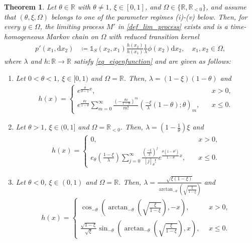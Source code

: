 \documentclass[12pt]{article}
\newcommand{\R}{\mathbb{R}} %
\newcommand{\1}{\mathds{1}}
\renewcommand{\d}{\mathrm{d}}
\theoremstyle{definition}
\theoremstyle{plain}
\newtheorem{Theorem}[definition]{Theorem}
\theoremstyle{remark}
\begin{document}
\begin{Theorem}\label{maintheorem}
    Let $\theta\in\R$ with $\theta\neq1$, $\xi\in[0,1]$, and
$\Omega\in\{\R,\R_{<0}\}$, and assume that
$(\theta,\xi,\Omega)$ belongs to one of the parameter regimes
 (i)-(v) below. Then, for every $y\in\Omega$, the limiting process $M'$ in \eqref{def_lim_process} exists and is a time-homogeneous Markov chain on $\Omega$ with reduced transition kernel 
\begin{align*}
     p'(x_1,\d x_2)&\coloneqq\mathds{1}_S(x_2,x_1)\frac{h(x_2)}{h(x_1)}\frac{1}{\lambda}\phi(x_2)\d x_2,\quad x_1,x_2\in\Omega,
\end{align*}
 where $\lambda$ and $h:\R\to\R$ satisfy \eqref{eq_eigenfunction} and are given as follows:
\begin{enumerate}[label=(\roman*)]
     \item  Let $0<\theta<1$, $\xi\in [0,1)$ and $\Omega=\R$. Then, $\lambda=(1-\xi)(1-\theta)$ and
     \begin{align*}
         h(x)=\begin{cases}
          e^{\frac{\theta}{\theta-1}x},~~~&x>0,
          \\e^{\frac{\theta x}{1-\theta}}\sum_{m=0}^\infty\frac{\left(-\frac{\theta x}{1-\theta}\right)^m}{m!}\left(\frac{-\xi}{\lambda}(1-\theta);\theta\right)_m,~~~~&x\le 0.
      \end{cases}
     \end{align*}
     \item  Let $\theta>1$, $\xi\in(0,1]$ and $\Omega=\R_{<0}$. Then, $\lambda=\left(1-\frac{1}{\theta}\right)\xi$ and
     \begin{align*}
         h(x)= \begin{cases}
          0,~~~&x>0,
          \\{e_\theta\left(\frac{1-\xi}{\lambda}\right)}\sum_{j=0}^\infty \frac{\left(\frac{-\xi}{\lambda}\right)^{j}}{[j]_\theta!}e^{\frac{\theta(1-\theta^j)}{1-\theta}x},\quad &x\le0.\end{cases}
     \end{align*}
 \item Let $\theta <0$, $\xi\in(0,1)$ and $\Omega=\R$. Then, $\lambda= \frac{\sqrt{\xi(1-\xi)}}{\arctan_{-\theta}\left(\sqrt{\frac{\xi}{1-\xi}}\right)}$ and
 \begin{align*}
      h(x)=\begin{cases}
       \cos_{-\theta}\left(\arctan_{-\theta}\left(\sqrt{\frac{\xi}{1-\xi}}\right),-x\right) ,~~&x>0,
        \\\frac{\sqrt{1-\xi}}{\sqrt{\xi}}\sin_{-\theta}\left(\arctan_{-\theta}\left(\sqrt{\frac{\xi}{1-\xi}}\right),x\right),~~&x\le 0.

\end{cases}
\end{align*}
\end{enumerate}
\end{Theorem}
\end{document}
